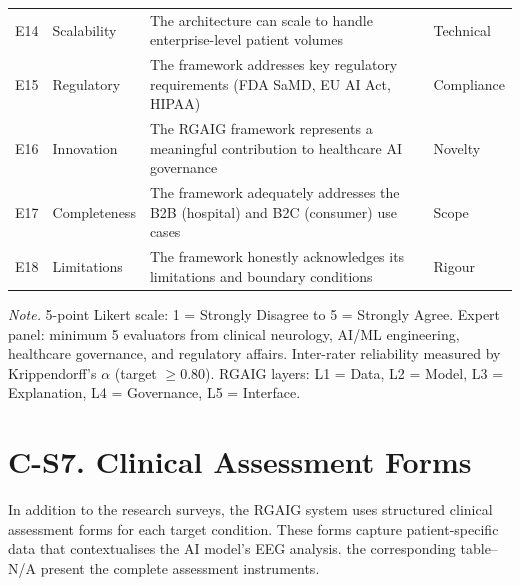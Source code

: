 \begin{table}[p]
\begin{tabularx}{\textwidth}{@{} >{\raggedright\arraybackslash}p{0.5cm} >{\raggedright\arraybackslash}p{2.2cm} L >{\raggedright\arraybackslash}p{1.5cm} @{}}
E14 & Scalability & The architecture can scale to handle enterprise-level patient volumes & Technical \\
\addlinespace
E15 & Regulatory & The framework addresses key regulatory requirements (FDA SaMD, EU AI Act, HIPAA) & Compliance \\
\addlinespace
E16 & Innovation & The RGAIG framework represents a meaningful contribution to healthcare AI governance & Novelty \\
\addlinespace
E17 & Completeness & The framework adequately addresses the B2B (hospital) and B2C (consumer) use cases & Scope \\
\addlinespace
E18 & Limitations & The framework honestly acknowledges its limitations and boundary conditions & Rigour \\
\bottomrule
\end{tabularx}
\vspace{0.5em}
\noindent\textit{Note.} 5-point Likert scale: 1 = Strongly Disagree to 5 = Strongly Agree. Expert panel: minimum 5 evaluators from clinical neurology, AI/ML engineering, healthcare governance, and regulatory affairs. Inter-rater reliability measured by Krippendorff's $\alpha$ (target $\geq$0.80). RGAIG layers: L1 = Data, L2 = Model, L3 = Explanation, L4 = Governance, L5 = Interface.
\end{table}


\section*{C-S7. Clinical Assessment Forms}
\label{sec:appc_clinical_forms}

In addition to the research surveys, the RGAIG system uses structured clinical assessment forms for each target condition. These forms capture patient-specific data that contextualises the AI model's EEG analysis. the corresponding table--N/A present the complete assessment instruments.


